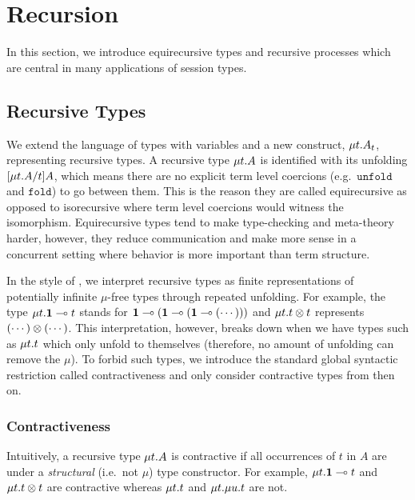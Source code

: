 
\section{Recursion}
\label{base:recursion}

In this section, we introduce equirecursive types and recursive processes which are central in many applications of session types.


\subsection{Recursive Types}
\label{recursive-types}

We extend the language of types with variables and a new construct, $\mu{t} . {A_t}$, representing recursive types. A recursive type $\mu{t} . {A}$ is identified with its unfolding $\lbrack{\mu{t} . {A}}/{t}\rbrack{A}$, which means there are no explicit term level coercions (e.g.\ $\mathtt{unfold}$ and $\mathtt{fold}$) to go between them. This is the reason they are called equirecursive as opposed to isorecursive where term level coercions would witness the isomorphism. Equirecursive types tend to make type-checking and meta-theory harder, however, they reduce communication and make more sense in a concurrent setting where behavior is more important than term structure.

In the style of \cite{AmadioC91}, we interpret recursive types as finite representations of potentially infinite $\mu$-free types through repeated unfolding. For example, the type $\mu{t} . {\mathbf{1} \multimap t}$ stands for $\mathbf{1} \multimap (\mathbf{1} \multimap (\mathbf{1} \multimap (\cdots )))$ and $\mu{t} . {t \otimes t}$ represents $(\cdots) \otimes (\cdots)$. This interpretation, however, breaks down when we have types such as $\mu{t} . {t}$ which only unfold to themselves (therefore, no amount of unfolding can remove the $\mu$). To forbid such types, we introduce the standard global syntactic restriction called contractiveness \cite{StoneS05, GayH05} and only consider contractive types from then on.


\subsubsection{Contractiveness}

Intuitively, a recursive type $\mu{t} . {A}$ is contractive if all occurrences of $t$ in $A$ are under a \emph{structural} (i.e.\ not $\mu$) type constructor. For example, $\mu{t} . {\mathbf{1} \multimap t}$ and $\mu{t} . {t \otimes t}$ are contractive whereas $\mu{t} . {t}$ and $\mu{t} . {\mu{u} . {t}}$ are not.

